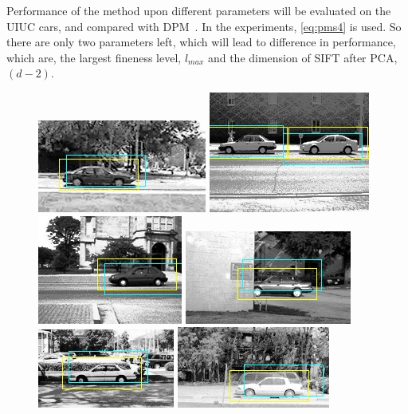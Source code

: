 Performance of the method upon different parameters will be evaluated on the UIUC cars, and compared with DPM~\citep{ac31}. 
In the experiments, \ref{eq:pms4} is used. So there are only two parameters left, which will lead to difference in performance, which are, the largest fineness level, $l_{max}$ and the dimension of SIFT after PCA, $(d-2)$.



\begin{figure}[H]
\centering

\includegraphics[scale=0.75]{test-0_good.jpg}
\includegraphics[scale=0.75]{test-10_good.jpg}
\includegraphics[scale=0.75]{test-14_good.jpg}
\includegraphics[scale=0.75]{test-16_good.jpg}
\includegraphics[scale=0.75]{test-20_good.jpg}
\includegraphics[scale=0.75]{test-21_good.jpg}

\end{figure}
